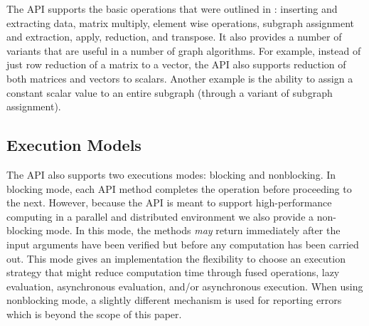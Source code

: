 The API supports the basic operations that were outlined in \cite{mathgraphblas16}:
inserting and extracting data, matrix multiply, element wise operations, subgraph assignment
and extraction, apply, reduction, and transpose.  It also provides a number of
variants that are useful in a number of graph algorithms. For example, instead of
just row reduction of a matrix to a vector, the API also supports reduction of both
matrices and vectors to scalars.  Another example is the ability to assign a constant
scalar value to an entire subgraph (through a variant of subgraph assignment). 

\subsection{Execution Models}

The API also supports two executions modes: blocking and nonblocking. In blocking mode,
each API method completes the operation before proceeding to the next.  However, 
because the API is meant to support high-performance computing in a parallel and
distributed environment we also provide a non-blocking mode.  In this mode, the methods
{\em may} return immediately after the input arguments have been verified but before
any computation has been carried out.  This mode gives an implementation the flexibility
to choose an execution strategy that might reduce computation time through fused
operations, lazy evaluation, asynchronous evaluation, and/or asynchronous execution.  When
using nonblocking mode, a slightly different mechanism is used for reporting errors which
is beyond the scope of this paper.
